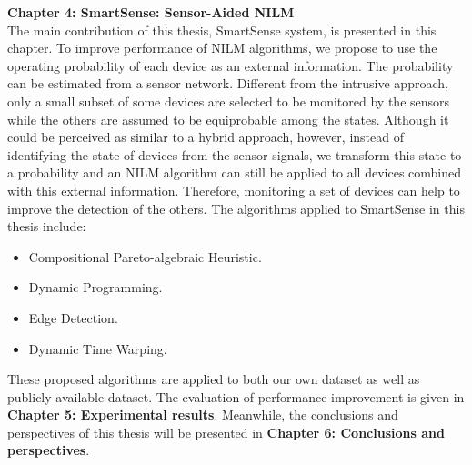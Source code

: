\textbf{Chapter 4: SmartSense: Sensor-Aided NILM}\\
The main contribution of this thesis, SmartSense system, is presented in this chapter. To improve performance of NILM algorithms, we propose to use the operating probability of each device as an external information. The probability can be estimated from a sensor network. Different from the intrusive approach, only a small subset of some devices are selected to be monitored by the sensors while the others are assumed to be equiprobable among the states. Although it could be perceived as similar to a hybrid approach, however, instead of identifying the state of devices from the sensor signals, we transform this state to a probability and an NILM algorithm can still be applied to all devices combined with this external information. Therefore, monitoring a set of devices can help to improve the detection of the others. The algorithms applied to SmartSense in this thesis include:
\begin{itemize}
\item Compositional Pareto-algebraic Heuristic.
\item Dynamic Programming.
\item Edge Detection.
\item Dynamic Time Warping.
\end{itemize}

These proposed algorithms are applied to both our own dataset as well as publicly available dataset. The evaluation of performance improvement is given in \textbf{Chapter 5: Experimental results}. Meanwhile, the conclusions and perspectives of this thesis will be presented in \textbf{Chapter 6: Conclusions and perspectives}.
